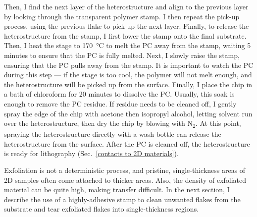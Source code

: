 \documentclass[double,12pt,1in,seploa]{beavtex}
\begin{document}
Then, I find the next layer of the heterostructure and align to the previous layer by looking through the transparent polymer stamp. I then repeat the pick-up process, using the previous flake to pick up the next layer. Finally, to release the heterostructure from the stamp, I first lower the stamp onto the final substrate. Then, I heat the stage to \SI{170}{\celsius} to melt the PC away from the stamp, waiting 5 minutes to ensure that the PC is fully melted. Next, I slowly raise the stamp, ensuring that the PC pulls away from the stamp. It is important to watch the PC during this step — if the stage is too cool, the polymer will not melt enough, and the heterostructure will be picked up from the surface. Finally, I place the chip in a bath of chloroform for 20 minutes to dissolve the PC. Usually, this soak is enough to remove the PC residue. If residue needs to be cleaned off, I gently spray the edge of the chip with acetone then isopropyl alcohol, letting solvent run over the heterostructure, then dry the chip by blowing with N\textsubscript{2}. At this point, spraying the heterostructure directly with a wash bottle can release the heterostructure from the surface. After the PC is cleaned off, the heterostructure is ready for lithography (Sec.\ \ref{contacts to 2D materials}).

Exfoliation is not a deterministic process, and pristine, single-thickness areas of 2D samples often come attached to thicker areas. Also, the density of exfoliated material can be quite high, making transfer difficult. In the next section, I describe the use of a highly-adhesive stamp to clean unwanted flakes from the substrate and tear exfoliated flakes into single-thickness regions.





\begin{center}

    \linespread{1.0}\selectfont

\end{center}
\end{document}
